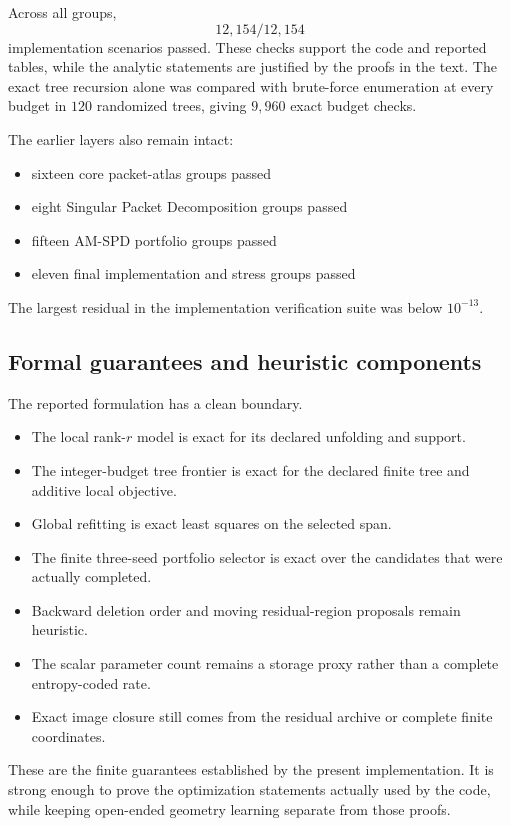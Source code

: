 \documentclass[11pt]{article}
\theoremstyle{definition}
\theoremstyle{remark}
\begin{document}
Across all groups,
\[
\boxed{12{,}154/12{,}154}
\]
implementation scenarios passed. These checks support the code and reported tables, while the analytic statements are justified by the proofs in the text. The exact tree recursion alone was compared with brute-force enumeration at every budget in $120$ randomized trees, giving $9{,}960$ exact budget checks.

The earlier layers also remain intact:

\begin{itemize}
\item sixteen core packet-atlas groups passed
\item eight Singular Packet Decomposition groups passed
\item fifteen AM-SPD portfolio groups passed
\item eleven final implementation and stress groups passed
\end{itemize}

The largest residual in the implementation verification suite was below $10^{-13}$.



\FloatBarrier
\subsection{Formal guarantees and heuristic components}
The reported formulation has a clean boundary.

\begin{itemize}
\item The local rank-$r$ model is exact for its declared unfolding and support.
\item The integer-budget tree frontier is exact for the declared finite tree and additive local objective.
\item Global refitting is exact least squares on the selected span.
\item The finite three-seed portfolio selector is exact over the candidates that were actually completed.
\item Backward deletion order and moving residual-region proposals remain heuristic.
\item The scalar parameter count remains a storage proxy rather than a complete entropy-coded rate.
\item Exact image closure still comes from the residual archive or complete finite coordinates.
\end{itemize}

These are the finite guarantees established by the present implementation. It is strong enough to prove the optimization statements actually used by the code, while keeping open-ended geometry learning separate from those proofs.
\end{document}
